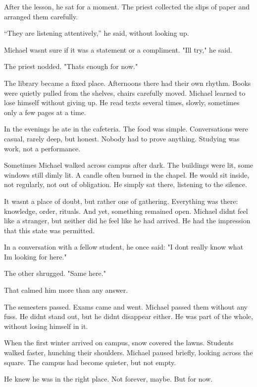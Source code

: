 \documentclass[
]{article}
\begin{document}
After the lesson, he sat for a moment. The priest collected the slips of paper and arranged them carefully.

``They are listening attentively,'' he said, without looking up.

Michael wasn\textquotesingle t sure if it was a statement or a compliment. "I\textquotesingle ll try," he said.

The priest nodded. "That\textquotesingle s enough for now."

The library became a fixed place. Afternoons there had their own rhythm. Books were quietly pulled from the shelves, chairs carefully moved. Michael learned to lose himself without giving up. He read texts several times, slowly, sometimes only a few pages at a time.

In the evenings he ate in the cafeteria. The food was simple. Conversations were casual, rarely deep, but honest. Nobody had to prove anything. Studying was work, not a performance.

Sometimes Michael walked across campus after dark. The buildings were lit, some windows still dimly lit. A candle often burned in the chapel. He would sit inside, not regularly, not out of obligation. He simply sat there, listening to the silence.

It wasn\textquotesingle t a place of doubt, but rather one of gathering. Everything was there: knowledge, order, rituals. And yet, something remained open. Michael didn\textquotesingle t feel like a stranger, but neither did he feel like he had arrived. He had the impression that this state was permitted.

In a conversation with a fellow student, he once said: "I don\textquotesingle t really know what I\textquotesingle m looking for here."

The other shrugged. "Same here."

That calmed him more than any answer.

The semesters passed. Exams came and went. Michael passed them without any fuss. He didn\textquotesingle t stand out, but he didn\textquotesingle t disappear either. He was part of the whole, without losing himself in it.

When the first winter arrived on campus, snow covered the lawns. Students walked faster, hunching their shoulders. Michael paused briefly, looking across the square. The campus had become quieter, but not empty.

He knew he was in the right place. Not forever, maybe. But for now.
\end{document}
